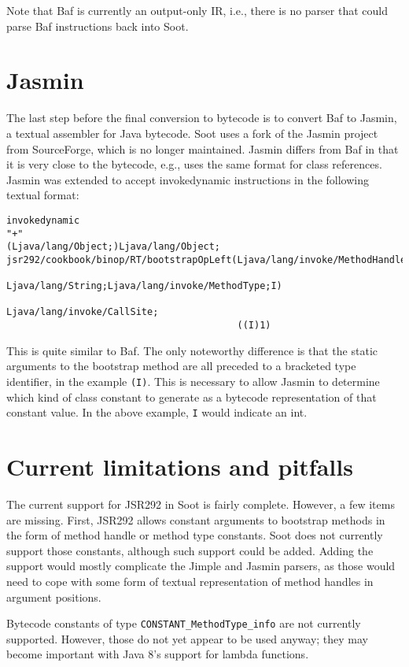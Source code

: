 \documentclass{article}
\begin{document}
Note that Baf is currently an output-only IR, i.e., there is no parser that
could parse Baf instructions back into Soot.

\section{Jasmin}
The last step before the final conversion to bytecode is to convert Baf to
Jasmin, a textual assembler for Java bytecode. Soot uses a fork of the Jasmin
project from SourceForge, which is no longer maintained. Jasmin differs
from Baf in that it is very close to the bytecode, e.g., uses the same
format for class references. Jasmin was extended to accept invokedynamic
instructions in the following textual format:

\begin{verbatim}
invokedynamic
"+"
(Ljava/lang/Object;)Ljava/lang/Object;
jsr292/cookbook/binop/RT/bootstrapOpLeft(Ljava/lang/invoke/MethodHandles$Lookup;
                                         Ljava/lang/String;Ljava/lang/invoke/MethodType;I)
                                            Ljava/lang/invoke/CallSite;
                                         ((I)1)
\end{verbatim}

This is quite similar to Baf. The only noteworthy difference is that the
static arguments to the bootstrap method are all preceded to a bracketed type
identifier, in the example \texttt{(I)}. This is necessary to allow Jasmin to
determine which kind of class constant to generate as a bytecode representation
of that constant value. In the above example, \texttt{I} would indicate an int.

\section{Current limitations and pitfalls}
The current support for JSR292 in Soot is fairly complete. However, a few items
are missing. First, JSR292 allows constant arguments to bootstrap methods in the
form of method handle or method type constants. Soot does not currently support
those constants, although such support could be added. Adding the support would
mostly complicate the Jimple and Jasmin parsers, as those would need to cope
with some form of textual representation of method handles in argument
positions.

Bytecode constants of type \texttt{CONSTANT\_MethodType\_info} are not
currently supported. However, those do not yet appear to be used anyway; they
may become important with Java 8's support for lambda functions.
\end{document}
